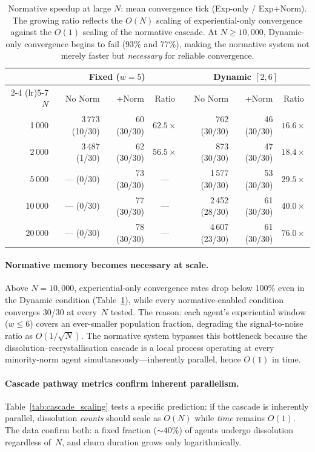 \documentclass[11pt,a4paper]{article}
\begin{document}
\begin{table}[H]
\centering
\caption{Normative speedup at large $N$: mean convergence tick (Exp-only / Exp+Norm). The growing ratio reflects the $O(N)$ scaling of experiential-only convergence against the $O(1)$ scaling of the normative cascade. At $N \geq 10{,}000$, Dynamic-only convergence begins to fail (93\% and 77\%), making the normative system not merely faster but \emph{necessary} for reliable convergence.}
\label{tab:large_N_speedup}
\begin{tabular}{@{}r rrc rrc@{}}
\toprule
& \multicolumn{3}{c}{Fixed ($w{=}5$)} & \multicolumn{3}{c}{Dynamic $[2,6]$} \\
\cmidrule(lr){2-4} \cmidrule(lr){5-7}
$N$ & No Norm & +Norm & Ratio & No Norm & +Norm & Ratio \\
\midrule
1\,000   & 3\,773 (10/30) & 60  (30/30) & $62.5\times$ & 762  (30/30) & 46  (30/30) & $16.6\times$ \\
2\,000   & 3\,487 (1/30)  & 62  (30/30) & $56.5\times$ & 873  (30/30) & 47  (30/30) & $18.4\times$ \\
5\,000   & --- (0/30)     & 73  (30/30) & ---           & 1\,577 (30/30) & 53 (30/30) & $29.5\times$ \\
10\,000  & --- (0/30)     & 77  (30/30) & ---           & 2\,452 (28/30) & 61 (30/30) & $40.0\times$ \\
20\,000  & --- (0/30)     & 78  (30/30) & ---           & 4\,607 (23/30) & 61 (30/30) & $76.0\times$ \\
\bottomrule
\end{tabular}
\end{table}

\paragraph{Normative memory becomes necessary at scale.} Above $N{=}10{,}000$, experiential-only convergence rates drop below 100\% even in the Dynamic condition (Table~\ref{tab:large_N_speedup}), while every normative-enabled condition converges 30/30 at every~$N$ tested. The reason: each agent's experiential window ($w \leq 6$) covers an ever-smaller population fraction, degrading the signal-to-noise ratio as $O(1/\sqrt{N})$. The normative system bypasses this bottleneck because the dissolution--recrystallisation cascade is a local process operating at every minority-norm agent simultaneously---inherently parallel, hence $O(1)$ in time.

\paragraph{Cascade pathway metrics confirm inherent parallelism.} Table~\ref{tab:cascade_scaling} tests a specific prediction: if the cascade is inherently parallel, dissolution \emph{counts} should scale as $O(N)$ while \emph{time} remains $O(1)$. The data confirm both: a fixed fraction (${\sim}40\%$) of agents undergo dissolution regardless of~$N$, and churn duration grows only logarithmically.
\end{document}
